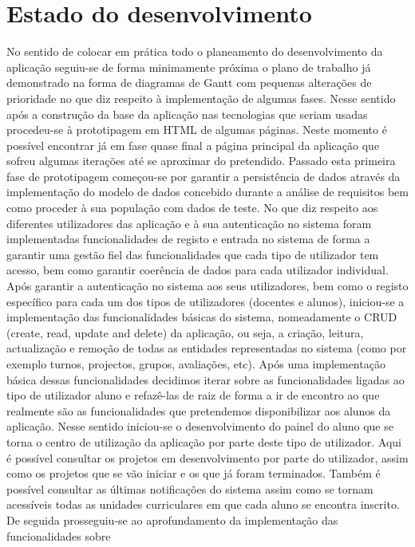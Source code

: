 \section{Estado do desenvolvimento}
No sentido de colocar em prática todo o planeamento do desenvolvimento da 
aplicação seguiu-se de forma minimamente próxima o plano de trabalho já 
demonstrado na forma de diagramas de Gantt com pequenas alterações de prioridade 
no que diz respeito à implementação de algumas fases.
Nesse sentido após a construção da base da aplicação nas tecnologias que seriam 
usadas procedeu-se à prototipagem em HTML de algumas páginas. Neste momento 
é possível encontrar já em fase quase final a página principal da aplicação que sofreu 
algumas iterações até se aproximar do pretendido. Passado esta primeira fase de 
prototipagem começou-se por garantir a persistência de dados através da 
implementação do modelo de dados concebido durante a análise de requisitos bem 
como proceder à sua população com dados de teste.
No que diz respeito aos diferentes utilizadores das aplicação e à sua 
autenticação no sistema foram implementadas funcionalidades de registo e entrada 
no sistema de forma a garantir uma gestão fiel das funcionalidades que cada tipo 
de utilizador tem acesso, bem como garantir coerência de dados para cada 
utilizador individual. Após garantir a autenticação no sistema aos seus utilizadores,
 bem como o registo específico para cada um dos tipos de utilizadores (docentes e alunos), iniciou-se a
 implementação das funcionalidades básicas do sistema, nomeadamente o CRUD (create, read, update
 and delete) da aplicação, ou seja, a criação, leitura, actualização e remoção 
 de todas as entidades representadas no sistema (como por exemplo turnos, projectos, grupos, 
 avaliações, etc).
 Após uma implementação básica dessas funcionalidades decidimos iterar sobre as 
 funcionalidades ligadas ao tipo de utilizador aluno e refazê-las de raiz de forma a ir 
 de encontro ao que realmente são as funcionalidades que pretendemos 
 disponibilizar aos alunos da aplicação.
 Nesse sentido iniciou-se o desenvolvimento do painel do aluno que se torna o 
 centro de utilização da aplicação por parte deste tipo de utilizador. Aqui é 
 possível consultar os projetos em desenvolvimento por parte do utilizador, 
 assim como os projetos que se vão iniciar e os que já foram terminados. Também 
 é possível consultar as últimas notificações do sistema assim como se tornam 
 acessíveis todas as unidades curriculares em que cada aluno se encontra 
 inscrito. De seguida prosseguiu-se ao aprofundamento da implementação das funcionalidades sobre 
